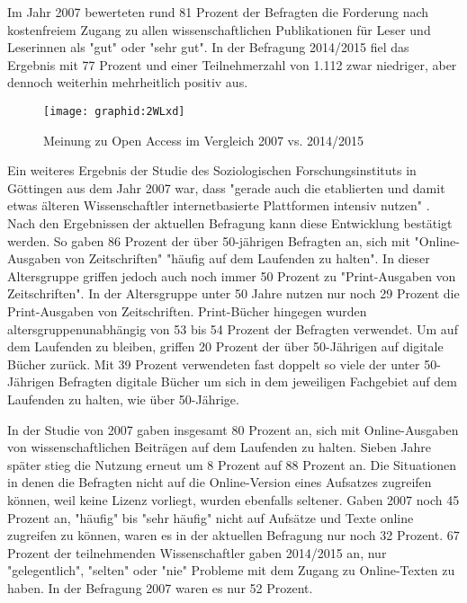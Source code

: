 Im Jahr 2007 bewerteten rund 81 Prozent der Befragten die Forderung nach kostenfreiem Zugang zu allen wissenschaftlichen Publikationen für Leser und Leserinnen als "gut" oder "sehr gut". In der Befragung 2014/2015 fiel das Ergebnis mit 77 Prozent und einer Teilnehmerzahl von 1.112 zwar niedriger, aber dennoch weiterhin mehrheitlich positiv aus.

\begin{figure}[h!]
\texttt{[image: graphid:2WLxd]}
\caption{Meinung zu Open Access im Vergleich 2007 vs. 2014/2015}
\end{figure}

Ein weiteres Ergebnis der Studie des Soziologischen Forschungsinstituts in Göttingen aus dem Jahr 2007 war, dass "gerade auch die etablierten und damit etwas älteren Wissenschaftler internetbasierte Plattformen intensiv nutzen" \cite{hanekop_wittke_2007}. Nach den Ergebnissen der aktuellen Befragung kann diese Entwicklung bestätigt werden. So gaben 86 Prozent der über 50-jährigen Befragten an, sich mit "Online-Ausgaben von Zeitschriften" "häufig auf dem Laufenden zu halten". In dieser Altersgruppe griffen jedoch auch noch immer 50 Prozent zu "Print-Ausgaben von Zeitschriften". In der Altersgruppe unter 50 Jahre nutzen nur noch 29 Prozent die Print-Ausgaben von Zeitschriften. Print-Bücher hingegen wurden altersgruppenunabhängig von 53 bis 54 Prozent der Befragten verwendet. Um auf dem Laufenden zu bleiben, griffen 20 Prozent der über 50-Jährigen auf digitale Bücher zurück. Mit 39 Prozent verwendeten fast doppelt so viele der unter 50-Jährigen Befragten digitale Bücher um sich in dem jeweiligen Fachgebiet auf dem Laufenden zu halten, wie über 50-Jährige.

In der Studie von 2007 gaben insgesamt 80 Prozent an, sich mit Online-Ausgaben von wissenschaftlichen Beiträgen auf dem Laufenden zu halten. Sieben Jahre später stieg die Nutzung erneut um 8 Prozent auf 88 Prozent an. Die Situationen in denen die Befragten nicht auf die Online-Version eines Aufsatzes zugreifen können, weil keine Lizenz vorliegt, wurden ebenfalls seltener. Gaben 2007 noch 45 Prozent an, "häufig" bis "sehr häufig" nicht auf Aufsätze und Texte online zugreifen zu können, waren es in der aktuellen Befragung nur noch 32 Prozent. 67 Prozent der teilnehmenden Wissenschaftler gaben 2014/2015 an, nur "gelegentlich", "selten" oder "nie" Probleme mit dem Zugang zu Online-Texten zu haben. In der Befragung 2007 waren es nur 52 Prozent.

